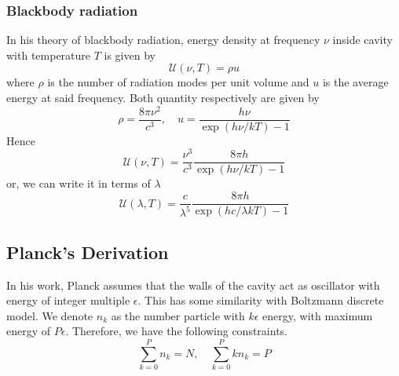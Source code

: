 \documentclass[../../../Main.tex]{subfiles}
\begin{document}
\subsubsection*{Blackbody radiation}
In his theory of blackbody radiation, energy density at frequency $\nu$ inside cavity with temperature $T$ is given by
\begin{equation*}
    \mathcal{U}(\nu,T)=\rho u
\end{equation*}
where $\rho$ is the number of radiation modes per unit volume and $u$ is the average energy at said frequency. Both quantity respectively are given by 
\begin{equation*}
    \rho=\frac{8\pi\nu^2}{c^3},\quad u=\frac{h\nu}{\exp(h\nu/k T)-1}
\end{equation*}
Hence
\begin{equation*}
    \mathcal{U}(\nu,T)=\frac{\nu^3}{c^3}\frac{8\pi h}{\exp(h\nu/k T)-1}
\end{equation*}
or, we can write it in terms of $\lambda$
\begin{equation*}
    \mathcal{U}(\lambda,T)=\frac{c}{\lambda^5}\frac{8\pi h}{\exp(hc/\lambda k T)-1}
\end{equation*}

\subsection*{Planck's Derivation}

In his work, Planck assumes that the walls of the cavity act as oscillator with  energy of integer multiple $\epsilon$. This has some similarity with Boltzmann discrete model. We denote $n_k$ as the number particle with $k\epsilon$ energy, with maximum energy of $P\epsilon$. Therefore, we have the following constraints.
\begin{equation*}
    \sum_{k=0}^{P}n_k=N,\quad\sum_{k=0}^{P}kn_k=P
\end{equation*}
\end{document}
